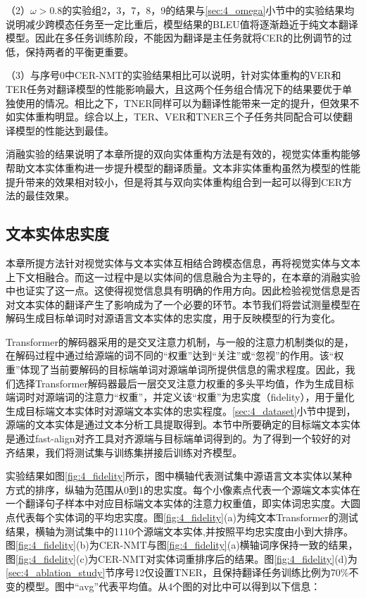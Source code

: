 （2）$\omega>0.8$的实验组2，3，7，8，9的结果与\ref{sec:4_omega}小节中的实验结果均说明减少跨模态任务至一定比重后，模型结果的BLEU值将逐渐趋近于纯文本翻译模型。因此在多任务训练阶段，不能因为翻译是主任务就将CER的比例调节的过低，保持两者的平衡更重要。

（3）与序号0中CER-NMT的实验结果相比可以说明，针对实体重构的VER和TER任务对翻译模型的性能影响最大，且这两个任务组合情况下的结果要优于单独使用的情况。相比之下，TNER同样可以为翻译性能带来一定的提升，但效果不如实体重构明显。综合以上，TER、VER和TNER三个子任务共同配合可以使翻译模型的性能达到最佳。

消融实验的结果说明了本章所提的双向实体重构方法是有效的，视觉实体重构能够帮助文本实体重构进一步提升模型的翻译质量。文本非实体重构虽然为模型的性能提升带来的效果相对较小，但是将其与双向实体重构组合到一起可以得到CER方法的最佳效果。

\subsection{文本实体忠实度}
\label{sec:4_fidelity}
本章所提方法针对视觉实体与文本实体互相结合跨模态信息，再将视觉实体与文本上下文相融合。而这一过程中是以实体间的信息融合为主导的，在本章的消融实验中也证实了这一点。这使得视觉信息具有明确的作用方向。因此检验视觉信息是否对文本实体的翻译产生了影响成为了一个必要的环节。本节我们将尝试测量模型在解码生成目标单词时对源语言文本实体的忠实度，用于反映模型的行为变化。


Transformer的解码器采用的是交叉注意力机制，与一般的注意力机制类似的是，在解码过程中通过给源端的词不同的“权重”达到“关注”或“忽视”的作用。该“权重”体现了当前要解码的目标端单词对源端单词所提供信息的需求程度。因此，我们选择Transformer解码器最后一层交叉注意力权重的多头平均值，作为生成目标端词时对源端词的注意力“权重”，并定义该“权重”为忠实度（fidelity），用于量化生成目标端文本实体时对源端文本实体的忠实程度。\ref{sec:4_dataset}小节中提到，源端的文本实体是通过文本分析工具提取得到。本节中所要确定的目标端文本实体是通过fast-align对齐工具对齐源端与目标端单词得到的。为了得到一个较好的对齐结果，我们将测试集与训练集拼接后训练对齐模型。


实验结果如图\ref{fig:4_fidelity}所示，图中横轴代表测试集中源语言文本实体以某种方式的排序，纵轴为范围从0到1的忠实度。每个小像素点代表一个源端文本实体在一个翻译句子样本中对应目标端文本实体的注意力权重值，即实体词忠实度。大圆点代表每个实体词的平均忠实度。图\ref{fig:4_fidelity}(a)为纯文本Transformer的测试结果，横轴为测试集中的1110个源端文本实体,并按照平均忠实度由小到大排序。图\ref{fig:4_fidelity}(b)为CER-NMT与图\ref{fig:4_fidelity}(a)横轴词序保持一致的结果，图\ref{fig:4_fidelity}(c)为CER-NMT对实体词重排序后的结果。图\ref{fig:4_fidelity}(d)为\ref{sec:4_ablation_study}节序号12仅设置TNER，且保持翻译任务训练比例为70\%不变的模型。图中“avg”代表平均值。从4个图的对比中可以得到以下信息：

